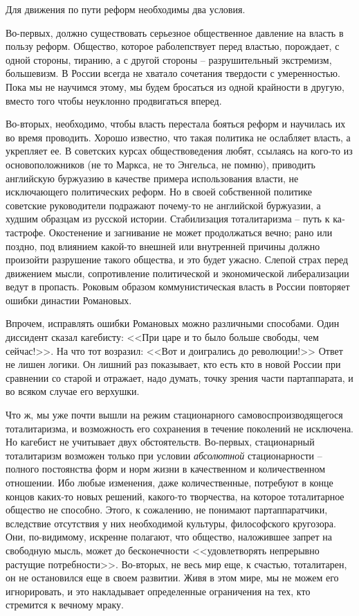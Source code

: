 \documentclass{book}
\begin{document}
Для движения по пути реформ необходимы два условия.

Во-первых, должно существовать серьезное общественное давление на власть в пользу реформ. Общество, которое раболепствует перед властью, порождает, с одной стороны, тиранию, а с другой стороны -- разрушительный экстремизм, большевизм. В России всегда не хватало сочетания твердости с уме­ренностью. Пока мы не научимся этому, мы будем бросаться из одной крайности в другую, вместо того чтобы неуклонно продвигаться вперед.

Во-вторых, необходимо, чтобы власть перестала бояться реформ и научилась их во время проводить. Хорошо известно, что такая политика не ослабляет власть, а укрепляет ее. В советских курсах обществоведения любят, ссылаясь на кого-то из основоположников (не то Маркса, не то Энгельса, не помню), приводить английскую буржуазию в качестве примера использования власти, не исключающего политических реформ. Но в своей собственной политике советские руководители подра­жают почему-то не английской буржуазии, а худшим образцам из русской истории. Стабилизация тоталитаризма -- путь к ка­тастрофе. Окостенение и загнивание не может продолжаться вечно; рано или поздно, под влиянием какой-то внешней или внутренней причины должно произойти разрушение такого об­щества, и это будет ужасно. Слепой страх перед движением мысли, сопротивление политической и экономической либера­лизации ведут в пропасть. Роковым образом коммунистиче­ская власть в России повторяет ошибки династии Романовых.

Впрочем, исправлять ошибки Романовых можно различны­ми способами. Один диссидент сказал кагебисту: <<При царе и то было больше свободы, чем сейчас!>>. На что тот возразил: <<Вот и доигрались до революции!>> Ответ не лишен логики. Он лишний раз показывает, кто есть кто в новой России при сравнении со старой и отражает, надо думать, точку зрения части партаппарата, и во всяком случае его верхушки.

Что ж, мы уже почти вышли на режим стационарного самовоспроизводящегося тоталитаризма, и возможность его сохранения в течение поколений не исключена. Но кагебист не учитывает двух обстоятельств. Во-первых, стационарный тоталитаризм возможен только при условии \textit{абсолютной}  стационарности -- полного постоянства форм и норм жизни в качественном и количественном отношении. Ибо любые изменения, даже количественные, потребуют в конце концов каких-то новых решений, какого-то творчества, на которое тоталитарное общество не способно. Этого, к сожалению, не понимают партаппаратчики, вследствие отсутствия у них необходимой куль­туры, философского кругозора. Они, по-видимому, искренне полагают, что общество, наложившее запрет на свободную мысль, может до бесконечности <<удовлетворять непрерывно растущие потребности>>. Во-вторых, не весь мир еще, к счастью, тоталитарен, он не остановился еще в своем развитии. Живя в этом мире, мы не можем его игнорировать, и это накладывает определенные ограничения на тех, кто стремится к 
вечному мраку.
\end{document}
